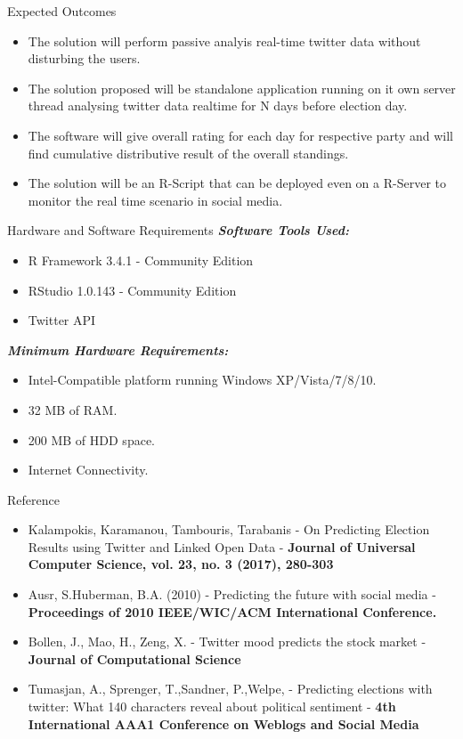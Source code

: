 \documentclass{beamer}
\begin{document}
\begin{frame}{Expected Outcomes}
	\begin{itemize}
		\item The solution will perform passive analyis real-time twitter data without disturbing the users.
		\item The solution proposed will be standalone application running on it own server thread analysing twitter data realtime for N days before election day.
		\item The software will give overall rating for each day for respective party and will find cumulative distributive result of the overall standings.
		\item The solution will be an R-Script that can be deployed even on a R-Server to monitor the real time scenario in social media.
	\end{itemize}
\end{frame}

\begin{frame}{Hardware and Software Requirements}
	\textbf{\textit{Software Tools Used:}}
	\begin{itemize}
		\item R Framework 3.4.1 - Community Edition
		\item RStudio 1.0.143 - Community  Edition
		\item Twitter API
	\end{itemize} 

	\textbf{\textit{Minimum Hardware Requirements:}}
	\begin{itemize}
		\item Intel-Compatible platform running Windows XP/Vista/7/8/10.
		\item 32 MB of RAM.
		\item 200 MB of HDD space.
		\item Internet Connectivity.
	\end{itemize}
\end{frame}

\begin{frame}{Reference}
	\begin{itemize}
		\item Kalampokis, Karamanou, Tambouris, Tarabanis - On Predicting Election Results using Twitter and Linked Open Data - \textbf{Journal of Universal Computer Science, vol. 23, no. 3 (2017), 280-303}
	 	\item Ausr, S.Huberman, B.A. (2010) - Predicting the future with social media - \textbf{Proceedings of 2010 IEEE/WIC/ACM International Conference.}
	 	\item Bollen, J., Mao, H., Zeng, X. - Twitter mood predicts the stock market - \textbf{Journal of Computational Science}
	 	\item Tumasjan, A., Sprenger, T.,Sandner, P.,Welpe, - Predicting elections with twitter: What 140 characters reveal about political sentiment - \textbf{4th International AAA1 Conference on Weblogs and Social Media}
	\end{itemize}
\end{frame}
\end{document}
